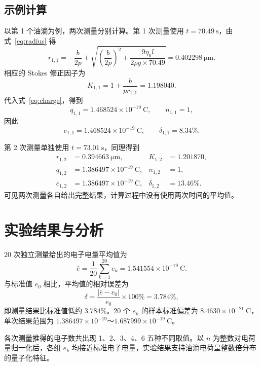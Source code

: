 \documentclass[UTF8,a4paper,12pt]{ctexart}
\begin{document}
\subsection{示例计算}
以第 1 个油滴为例，两次测量分别计算。第 1 次测量使用 $t=70.49\ \mathrm{s}$，由式~\eqref{eq:radius} 得
\begin{equation}
  r_{1,1}=-\frac{b}{2p}+
  \sqrt{\left(\frac{b}{2p}\right)^2+\frac{9\eta_0 l}{2\rho g\times70.49}}
  =0.402298\ \mathrm{\mu m}.
\end{equation}
相应的 Stokes 修正因子为
\begin{equation}
  K_{1,1}=1+\frac{b}{pr_{1,1}}=1.198040.
\end{equation}
代入式~\eqref{eq:charge}，得到
\begin{equation}
  q_{1,1}=1.468524\times10^{-19}\ \mathrm{C},\qquad n_{1,1}=1,
\end{equation}
因此
\begin{equation}
  e_{1,1}=1.468524\times10^{-19}\ \mathrm{C},\qquad \delta_{1,1}=8.34\%.
\end{equation}

第 2 次测量单独使用 $t=73.01\ \mathrm{s}$，同理得到
\begin{align}
  r_{1,2}&=0.394663\ \mathrm{\mu m}, & K_{1,2}&=1.201870,\\
  q_{1,2}&=1.386497\times10^{-19}\ \mathrm{C}, & n_{1,2}&=1,\\
  e_{1,2}&=1.386497\times10^{-19}\ \mathrm{C}, & \delta_{1,2}&=13.46\%.
\end{align}
可见两次测量各自给出完整结果，计算过程中没有使用两次时间的平均值。

\section{实验结果与分析}
20 次独立测量给出的电子电量平均值为
\begin{equation}
  \bar{e}=\frac{1}{20}\sum_{k=1}^{20}e_k
  =1.541554\times10^{-19}\ \mathrm{C}.
\end{equation}
与标准值 $e_0$ 相比，平均值的相对误差为
\begin{equation}
  \delta=\frac{|\bar{e}-e_0|}{e_0}\times100\%=3.784\%,
\end{equation}
即测量结果比标准值低约 $3.784\%$。20 个 $e_k$ 的样本标准偏差为 $8.4630\times10^{-21}\ \mathrm{C}$，单次结果范围为 $1.386497\times10^{-19}$～$1.687999\times10^{-19}\ \mathrm{C}$。

各次测量推得的电子数共出现 1、2、3、4、6 五种不同取值。以 $n$ 为整数对电荷量归一化后，各组 $e_k$ 均接近标准电子电量，实验结果支持油滴电荷呈整数倍分布的量子化特征。
\end{document}
